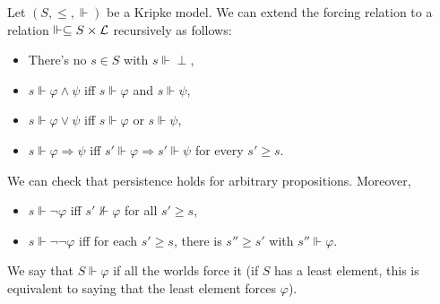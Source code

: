 \documentclass{article}
\numberwithin{thm}{subsection}
\begin{document}
\begin{fancydefine}{}
    Let $(S, \leq, \Vdash)$ be a Kripke model. We can extend the forcing relation to a relation $\Vdash \subseteq S \times \mathcal{L}$ recursively as follows: \begin{itemize}
        \item There's no $s \in S$ with $s \Vdash \perp$,
        \item $s \Vdash \varphi \wedge \psi$ iff $s \Vdash \varphi$ and $s \Vdash \psi$,
        \item $s \Vdash \varphi \vee \psi$ iff $s \Vdash \varphi$ or $s \Vdash \psi$,
        \item $s \Vdash \varphi \Rightarrow \psi$ iff $s' \Vdash \varphi \Rightarrow s' \Vdash \psi$ for every $s' \geq s$.
    \end{itemize}
\end{fancydefine}
We can check that persistence holds for arbitrary propositions. Moreover, \begin{itemize}
    \item $s \Vdash \neg \varphi$ iff $s' \nVdash \varphi$ for all $s' \geq s$,
    \item $s \Vdash \neg \neg \varphi$ iff for each $s' \geq s$, there is $s'' \geq s'$ with $s'' \Vdash \varphi$.
\end{itemize}
We say that $S \Vdash \varphi$ if all the worlds force it (if $S$ has a least element, this is equivalent to saying that the least element forces $\varphi$).
\end{document}
